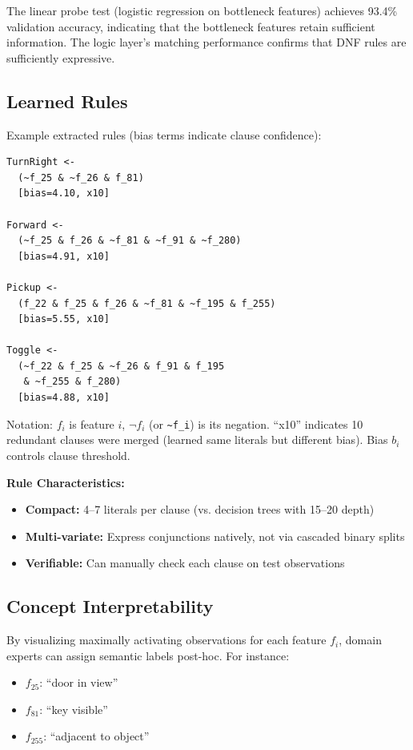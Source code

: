 \documentclass[11pt,twocolumn]{article}
\begin{document}
The linear probe test (logistic regression on bottleneck features) achieves 93.4\% validation accuracy, indicating that the bottleneck features retain sufficient information. The logic layer's matching performance confirms that DNF rules are sufficiently expressive.

\subsection{Learned Rules}

Example extracted rules (bias terms indicate clause confidence):

\begin{verbatim}
TurnRight <-
  (~f_25 & ~f_26 & f_81)
  [bias=4.10, x10]

Forward <-
  (~f_25 & f_26 & ~f_81 & ~f_91 & ~f_280)
  [bias=4.91, x10]

Pickup <-
  (f_22 & f_25 & f_26 & ~f_81 & ~f_195 & f_255)
  [bias=5.55, x10]

Toggle <-
  (~f_22 & f_25 & ~f_26 & f_91 & f_195
   & ~f_255 & f_280)
  [bias=4.88, x10]
\end{verbatim}

Notation: $f_i$ is feature $i$, $\lnot f_i$ (or \texttt{\textasciitilde f\_i}) is its negation. ``x10'' indicates 10 redundant clauses were merged (learned same literals but different bias). Bias $b_i$ controls clause threshold.

\textbf{Rule Characteristics:}
\begin{itemize}
\item \textbf{Compact:} 4--7 literals per clause (vs. decision trees with 15--20 depth)
\item \textbf{Multi-variate:} Express conjunctions natively, not via cascaded binary splits
\item \textbf{Verifiable:} Can manually check each clause on test observations
\end{itemize}

\subsection{Concept Interpretability}

By visualizing maximally activating observations for each feature $f_i$, domain experts can assign semantic labels post-hoc. For instance:
\begin{itemize}
\item $f_{25}$: ``door in view''
\item $f_{81}$: ``key visible''
\item $f_{255}$: ``adjacent to object''
\end{itemize}
\end{document}
